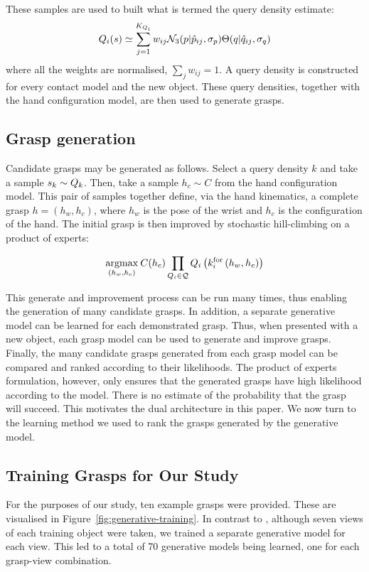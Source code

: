 These samples are used to built what is termed the query density estimate:
\begin{equation}
\qd_i(s) \simeq \sum^{K_{Q_i}}_{j=1} w_{ij} \mathcal{N}_3(p|{\hat{p}_{ij}}, \sigma_{p}) \Theta(q|{\hat{q}_{ij}}, \sigma_{q})%
\label{eq:qd.approx}
\end{equation}
where all the weights are normalised, $\sum_j w_{ij} = 1$. A query density is constructed for every contact model and the new object. These query densities, together with the hand configuration model, are then used to generate grasps.

\subsection{Grasp generation}
Candidate grasps may be generated as follows. Select a query density $k$ and take a sample  $s_k \sim Q_{k}$. Then, take a sample $h_c \sim C$ from the hand configuration model. This pair of samples together define, via the hand kinematics, a complete grasp $h=(h_w,h_c)$, where $h_w$ is the pose of the wrist and $h_c$ is the configuration of the hand. The initial grasp is then improved by stochastic hill-climbing on a product of experts:

\begin{equation}
\argmax{(h_w, h_c)} \hc(h_c) \prod_{\qd_i \in \mathcal{Q}} \qd_i\left(k_{i}^{\mathrm{for}}\left(h_w, h_c\right)\right)
\label{eq:grasping.product}
\end{equation}

This generate and improvement process can be run many times, thus enabling the generation of many candidate grasps. In addition, a separate generative model can be learned for each demonstrated grasp. Thus, when presented with a new object, each grasp model can be used to generate and improve grasps. Finally, the many candidate grasps generated from each grasp model can be compared and ranked according to their likelihoods. The product of experts formulation, however, only ensures that the generated grasps have high likelihood according to the model. There is no estimate of the probability that the grasp will succeed. This motivates the dual architecture in this paper. We now turn to the learning method we used to rank the grasps generated by the generative model. 

\subsection{Training Grasps for Our Study}

For the purposes of our study, ten example grasps were provided. These are visualised in Figure~\ref{fig:generative-training}. In contrast to \cite{kopicki2015ijrr}, although seven views of each training object were taken, we trained a separate generative model for each view. This led to a total of 70 generative models being learned, one for each grasp-view combination. 

